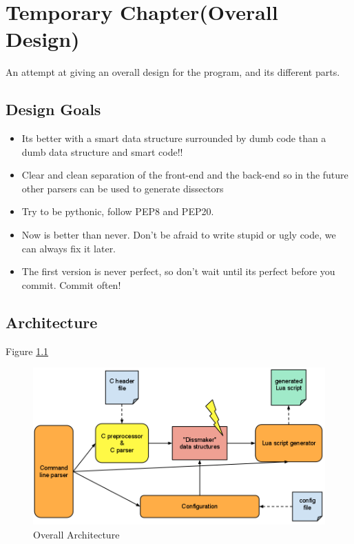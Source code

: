\chapter{Temporary Chapter(Overall Design)}
An attempt at giving an overall design for the program, and its different parts.
\section{Design Goals}
\begin{itemize}
	\item Its better with a smart data structure surrounded by dumb code than a dumb data structure and smart code!!
	\item Clear and clean separation of the front-end and the back-end so in the future other parsers can be used to generate dissectors
	\item Try to be pythonic, follow PEP8 and PEP20.
	\item Now is better than never. Don't be afraid to write stupid or ugly code, we can always fix it later.
	\item The first version is never perfect, so don't wait until its perfect before you commit. Commit often!
\end{itemize}

\section{Architecture}
Figure \ref{fig:archdesign}

\begin{figure}[!ht]
\includegraphics[width=\textwidth]{./planning/img/overall_design.png}
\caption{Overall Architecture}
\label{fig:archdesign}
\end{figure}

